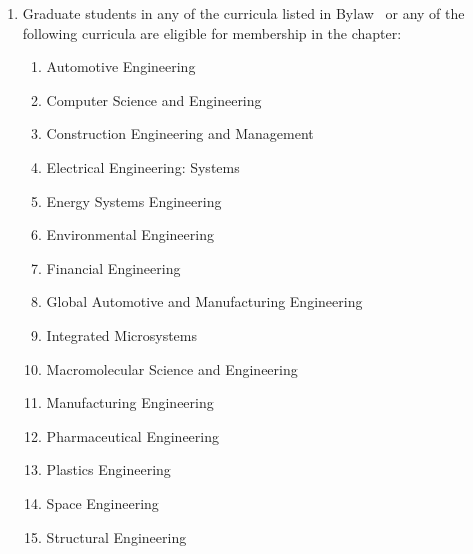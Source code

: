 \begin{enumerate}
\begin{enumerate}
        \item Computer Engineering
        \item Computer Science
        \item Data Science
        \item Earth System Science and Engineering
        \item Electrical Engineering
        \item Engineering
        \item Engineering Physics
        \item Industrial and Operations Engineering
        \item Materials Science and Engineering
        \item Mechanical Engineering
        \item Naval Architecture and Marine Engineering
        \item Nuclear Engineering and Radiological Sciences
        \item Robotics Engineering 
    \end{enumerate}
    \item {}
    Graduate students in any of the curricula listed in Bylaw~ or any of the following curricula are eligible for membership in the chapter:
    \begin{enumerate}
        \item Automotive Engineering
        \item Computer Science and Engineering
        \item Construction Engineering and Management
        \item Electrical Engineering: Systems
        \item Energy Systems Engineering
        \item Environmental Engineering
        \item Financial Engineering
        \item Global Automotive and Manufacturing Engineering
        \item Integrated Microsystems
        \item Macromolecular Science and Engineering
        \item Manufacturing Engineering
        \item Pharmaceutical Engineering
        \item Plastics Engineering
        \item Space Engineering
        \item Structural Engineering
    \end{enumerate}
\end{enumerate}


